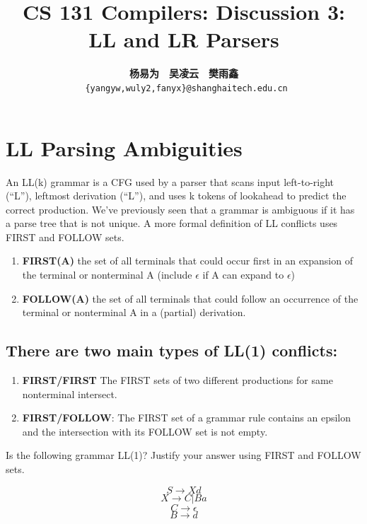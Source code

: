 \documentclass[a4paper]{exam}
\title{CS 131 Compilers: Discussion 3: LL and LR Parsers}
\author{\textbf{杨易为}~~\textbf{吴凌云}~~\textbf{樊雨鑫} \\ \texttt{ \{yangyw,wuly2,fanyx\}@shanghaitech.edu.cn}}
\begin{document}
\maketitle
\section{LL Parsing Ambiguities}
 An LL(k) grammar is a CFG used by a parser that scans
input left-to-right (“L”), leftmost derivation (“L”), and uses k tokens of lookahead to
predict the correct production. We’ve previously seen that a grammar is ambiguous
if it has a parse tree that is not unique. A more formal definition of LL conflicts uses
FIRST and FOLLOW sets.

\begin{enumerate}
  \item \textbf{FIRST(A)}  the set of all terminals that could occur first in an expansion of
  the terminal or nonterminal A (include $\epsilon$ if A can expand to $\epsilon$)
  \item \textbf{FOLLOW(A)}  the set of all terminals that could follow an occurrence of the
  terminal or nonterminal A in a (partial) derivation.
\end{enumerate}

\subsection{There are two main types of LL(1) conflicts:}
\begin{enumerate}
  \item \textbf{FIRST/FIRST} The FIRST sets of two different productions for same nonterminal intersect.
  \item \textbf{FIRST/FOLLOW}: The FIRST set of a grammar rule contains an epsilon and
  the intersection with its FOLLOW set is not empty.

\end{enumerate}

Is the following grammar LL(1)? Justify your answer using FIRST and FOLLOW sets.

$$S → Xd$$
$$X → C | Ba$$
$$C →\epsilon $$
$$B → d$$
\end{document}
